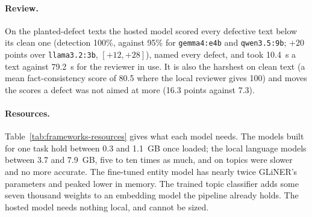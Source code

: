 \paragraph{Review.} On the planted-defect texts the hosted model scored
every defective text below its clean one (detection 100\%, against 95\%
for \texttt{gemma4:e4b} and \texttt{qwen3.5:9b}; $+20$ points over
\texttt{llama3.2:3b}, $[+12, +28]$), named every defect, and took 10.4~s
a text against 79.2~s for the reviewer in use. It is also the harshest
on clean text (a mean fact-consistency score of 80.5 where the local
reviewer gives 100) and moves the scores a defect was not aimed at more
(16.3 points against 7.3).

\paragraph{Resources.} Table~\ref{tab:frameworks-resources} gives what
each model needs. The models built for one task hold between 0.3 and
1.1~GB once loaded; the local language models between 3.7 and 7.9~GB,
five to ten times as much, and on topics were slower and no more
accurate. The fine-tuned entity model has nearly twice GLiNER's
parameters and peaked lower in memory. The trained topic classifier adds
some seven thousand weights to an embedding model the pipeline already
holds. The hosted model needs nothing local, and cannot be sized.

